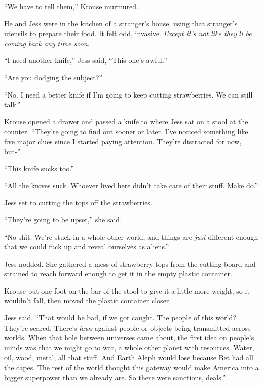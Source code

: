 





``We have to tell them,'' Krouse murmured.



He and Jess were in the kitchen of a stranger's house, using that stranger's utensils to prepare their food.  It felt odd, invasive.  \emph{Except it's not like they'll be coming back any time soon}.



``I need another knife,'' Jess said, ``This one's awful.''



``Are you dodging the subject?''



``No.  I need a better knife if I'm going to keep cutting strawberries.  We can still talk.''



Krouse opened a drawer and passed a knife to where Jess sat on a stool at the counter.  ``They're going to find out sooner or later.  I've noticed something like five major clues since I started paying attention.  They're distracted for now, but-''



``This knife sucks too.''



``All the knives suck.  Whoever lived here didn't take care of their stuff.  Make do.''



Jess set to cutting the tops off the strawberries.



``They're going to be upset,'' she said.



``No shit.  We're stuck in a whole other world, and things are \emph{just} different enough that we could fuck up and reveal ourselves as aliens.''



Jess nodded.  She gathered a mess of strawberry tops from the cutting board and strained to reach forward enough to get it in the empty plastic container.



Krouse put one foot on the bar of the stool to give it a little more weight, so it wouldn't fall, then moved the plastic container closer.



Jess said, ``That would be bad, if we got caught.  The people of this world?  They're scared.  There's \emph{laws} against people or objects being transmitted across worlds.  When that hole between universes came about, the first idea on people's minds was that we might go to war, a whole other planet with resources.  Water, oil, wood, metal, all that stuff.  And Earth Aleph would lose because Bet had all the capes.  The rest of the world thought this gateway would make America into a bigger superpower than we already are.  So there were sanctions, deals.''



